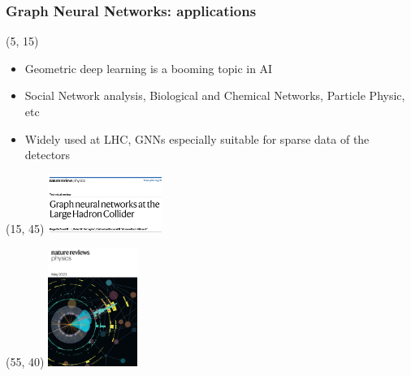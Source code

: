 \begin{frame}
    \frametitle{Graph Neural Networks: applications}
    \begin{textblock}{90}(5, 15)
      \begin{itemize}
        \item Geometric deep learning is a booming topic in AI 
        \item Social Network analysis, Biological and Chemical Networks, Particle Physic, etc
        \item Widely used at LHC, GNNs especially suitable for sparse data of the detectors

      \end{itemize}
    \end{textblock}

    \begin{textblock}{40}(15, 45)
      \includegraphics[width=140px]{img/gnn_lhc.png}
    \end{textblock}
    
    \begin{textblock}{30}(55, 40)
      \includegraphics[width=110px]{img/gnn_lhc2.jpg}
    \end{textblock}

\end{frame}


